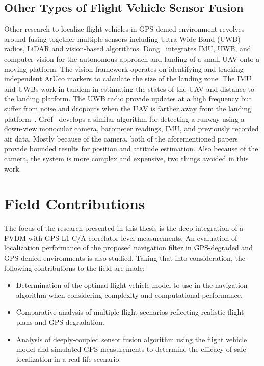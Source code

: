 \subsection{Other Types of Flight Vehicle Sensor Fusion}
Other research to localize flight vehicles in GPS-denied environment revolves around fusing together multiple sensors including Ultra Wide Band (UWB) radios, LiDAR and vision-based algorithms. Dong~\cite{dongIntegratedUWBIMUVisionFramework2022} integrates IMU, UWB, and computer vision for the autonomous approach and landing of a small UAV onto a moving platform. The vision framework operates on identifying and tracking independent ArUco markers to calculate the size of the landing zone. The IMU and UWBs work in tandem in estimating the states of the UAV and distance to the landing platform. The UWB radio provide updates at a high frequency but suffer from noise and dropouts when the UAV is farther away from the landing platform~\cite{dongIntegratedUWBIMUVisionFramework2022}. Gr\'of~\cite{grofPositioningAircraftRelative2022} develops a similar algorithm for detecting a runway using a down-view monocular camera, barometer readings, IMU, and previously recorded air data. Mostly because of the camera, both of the aforementioned papers provide bounded results for position and attitude estimation. Also because of the camera, the system is more complex and expensive, two things avoided in this work.

\section{Field Contributions}
The focus of the research presented in this thesis is the deep integration of a FVDM with GPS L1 C/A correlator-level measurements. An evaluation of localization performance of the proposed navigation filter in GPS-degraded and GPS denied environments is also studied. Taking that into consideration, the following contributions to the field are made:
\begin{itemize}
    \item Determination of the optimal flight vehicle model to use in the navigation algorithm when considering complexity and computational performance.
    \item Comparative analysis of multiple flight scenarios reflecting realistic flight plans and GPS degradation.
    \item Analysis of deeply-coupled sensor fusion algorithm using the flight vehicle model and simulated GPS measurements to determine the efficacy of safe localization in a real-life scenario.
\end{itemize}

